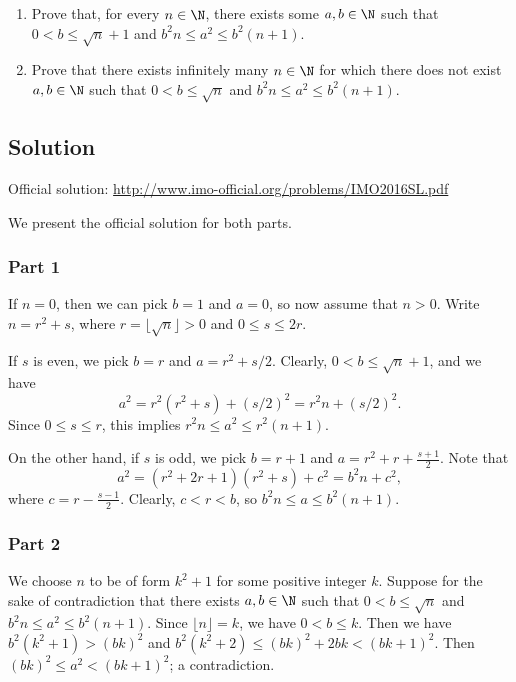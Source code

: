 \begin{enumerate}
\item Prove that, for every $n \in \N$, there exists some $a, b \in \N$ such that $0 < b \leq \sqrt{n} + 1$ and $b^2 n \leq a^2 \leq b^2 (n + 1)$.
\item Prove that there exists infinitely many $n \in \N$ for which there does not exist $a, b \in \N$ such that $0 < b \leq \sqrt{n}$ and $b^2 n \leq a^2 \leq b^2 (n + 1)$.
\end{enumerate}



\subsection*{Solution}

Official solution: \url{http://www.imo-official.org/problems/IMO2016SL.pdf}

We present the official solution for both parts.



\subsubsection*{Part 1}

If $n = 0$, then we can pick $b = 1$ and $a = 0$, so now assume that $n > 0$.
Write $n = r^2 + s$, where $r = \lfloor \sqrt{n} \rfloor > 0$ and $0 \leq s \leq 2r$.

If $s$ is even, we pick $b = r$ and $a = r^2 + s/2$.
Clearly, $0 < b \leq \sqrt{n} + 1$, and we have
\[ a^2 = r^2 (r^2 + s) + (s/2)^2 = r^2 n + (s/2)^2. \]
Since $0 \leq s \leq r$, this implies $r^2 n \leq a^2 \leq r^2 (n + 1)$.

On the other hand, if $s$ is odd, we pick $b = r + 1$ and $a = r^2 + r + \frac{s + 1}{2}$.
Note that
\[ a^2 = (r^2 + 2r + 1) (r^2 + s) + c^2 = b^2 n + c^2, \]
    where $c = r - \frac{s - 1}{2}$.
Clearly, $c < r < b$, so $b^2 n \leq a \leq b^2 (n + 1)$.



\subsubsection*{Part 2}

We choose $n$ to be of form $k^2 + 1$ for some positive integer $k$.
Suppose for the sake of contradiction that there exists $a, b \in \N$ such that $0 < b \leq \sqrt{n}$ and $b^2 n \leq a^2 \leq b^2 (n + 1)$.
Since $\lfloor n \rfloor = k$, we have $0 < b \leq k$.
Then we have $b^2 (k^2 + 1) > (bk)^2$ and $b^2 (k^2 + 2) \leq (bk)^2 + 2bk < (bk + 1)^2$.
Then $(bk)^2 \leq a^2 < (bk + 1)^2$; a contradiction.
